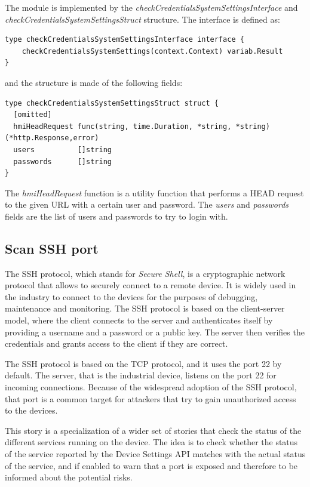 The module is implemented by the \textit{checkCredentialsSystemSettingsInterface} and \textit{checkCredentialsSystemSettingsStruct} structure. The interface is defined as:

\begin{lstlisting}[style=golang]
type checkCredentialsSystemSettingsInterface interface {
	checkCredentialsSystemSettings(context.Context) variab.Result
}
\end{lstlisting}

and the structure is made of the following fields:

\begin{lstlisting}[style=golang]
type checkCredentialsSystemSettingsStruct struct {
  [omitted]
  hmiHeadRequest func(string, time.Duration, *string, *string) (*http.Response,error)
  users          []string
  passwords      []string
}
\end{lstlisting}

The \textit{hmiHeadRequest} function is a utility function that performs a HEAD request to the given URL with a certain user and password. The \textit{users} and \textit{passwords} fields are the list of users and passwords to try to login with.

\subsection{Scan SSH port}

The SSH protocol, which stands for \textit{Secure Shell}, is a cryptographic network protocol that allows to securely connect to a remote device. It is widely used in the industry to connect to the devices for the purposes of debugging, maintenance and monitoring. The SSH protocol is based on the client-server model, where the client connects to the server and authenticates itself by providing a username and a password or a public key. The server then verifies the credentials and grants access to the client if they are correct.

The SSH protocol is based on the TCP protocol, and it uses the port 22 by default. The server, that is the industrial device, listens on the port 22 for incoming connections. Because of the widespread adoption of the SSH protocol, that port is a common target for attackers that try to gain unauthorized access to the devices.

This story is a specialization of a wider set of stories that check the status of the different services running on the device. The idea is to check whether the status of the service reported by the Device Settings API matches with the actual status of the service, and if enabled to warn that a port is exposed and therefore to be informed about the potential risks.

